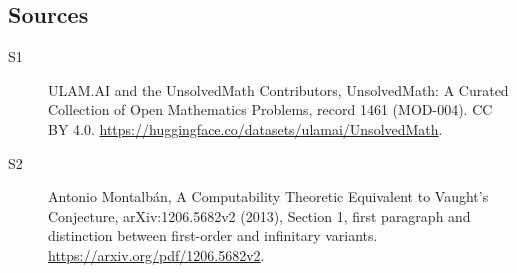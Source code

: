 \documentclass[11pt]{article}
\begin{document}
\subsection{Sources}
\begin{description}
\item[\hypertarget{source:1461:1}{S1}] ULAM.AI and the UnsolvedMath Contributors, UnsolvedMath: A Curated Collection of Open Mathematics Problems, record 1461 (MOD-004). CC BY 4.0. \url{https://huggingface.co/datasets/ulamai/UnsolvedMath}.
\item[\hypertarget{source:1461:2}{S2}] Antonio Montalbán, A Computability Theoretic Equivalent to Vaught’s Conjecture, arXiv:1206.5682v2 (2013), Section 1, first paragraph and distinction between first-order and infinitary variants. \url{https://arxiv.org/pdf/1206.5682v2}.
\end{description}
\label{end:1461}
\end{document}
